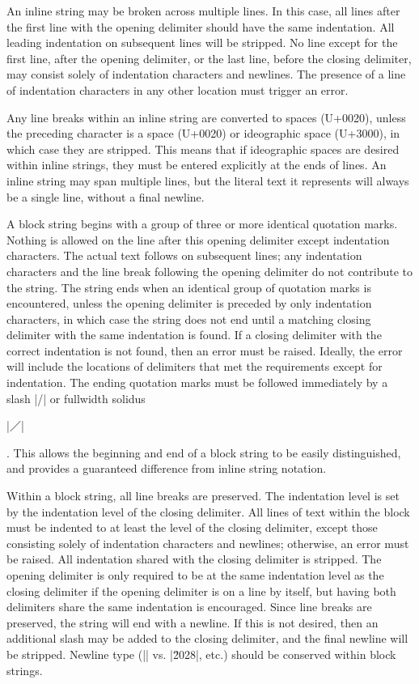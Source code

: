 \documentclass[11pt]{article}
\begin{document}
An inline string may be broken across multiple lines.  In this case, all lines after the first line with the opening delimiter should have the same indentation.  All leading indentation on subsequent lines will be stripped.  No line except for the first line, after the opening delimiter, or the last line, before the closing delimiter, may consist solely of indentation characters and newlines.  The presence of a line of indentation characters in any other location must trigger an error.

Any line breaks within an inline string are converted to spaces (U+0020), unless the preceding character is a space (U+0020) or ideographic space (U+3000), in which case they are stripped.  This means that if ideographic spaces are desired within inline strings, they must be entered explicitly at the ends of lines.  An inline string may span multiple lines, but the literal text it represents will always be a single line, without a final newline.

A block string begins with a group of three or more identical quotation marks.  Nothing is allowed on the line after this opening delimiter except indentation characters.  The actual text follows on subsequent lines; any indentation characters and the line break following the opening delimiter do not contribute to the string.  The string ends when an identical group of quotation marks is encountered, unless the opening delimiter is preceded by only indentation characters, in which case the string does not end until a matching closing delimiter with the same indentation is found.  If a closing delimiter with the correct indentation is not found, then an error must be raised.  Ideally, the error will include the locations of delimiters that met the requirements except for indentation.  The ending quotation marks must be followed immediately by a slash |/| or fullwidth solidus \begin{CJK*}{UTF8}{gkai}|／|\end{CJK*}.  This allows the beginning and end of a block string to be easily distinguished, and provides a guaranteed difference from inline string notation.

Within a block string, all line breaks are preserved.  The indentation level is set by the indentation level of the closing delimiter.  All lines of text within the block must be indented to at least the level of the closing delimiter, except those consisting solely of indentation characters and newlines; otherwise, an error must be raised.  All indentation shared with the closing delimiter is stripped.  The opening delimiter is only required to be at the same indentation level as the closing delimiter if the opening delimiter is on a line by itself, but having both delimiters share the same indentation is encouraged.  Since line breaks are preserved, the string will end with a newline.  If this is not desired, then an additional slash may be added to the closing delimiter, and the final newline will be stripped.  Newline type (|\n| vs. |\u2028|, etc.) should be conserved within block strings.
\end{document}
